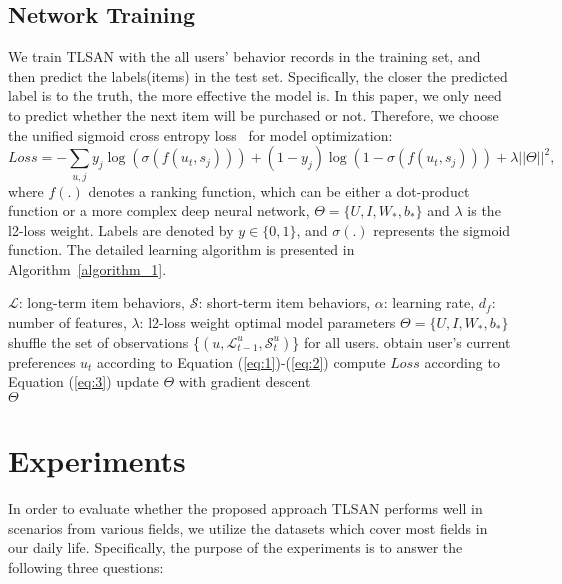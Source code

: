 \documentclass[preprint,12pt]{elsarticle}
\newcommand{\tool}{TLSAN\xspace}
\begin{document}
\begin{sloppypar}
\subsection{Network Training}

We train \tool with the all users' behavior records in the training set, and then predict the labels(items) in the test set. Specifically, the closer the predicted label is to the truth, the more effective the model is. In this paper, we only need to predict whether the next item will be purchased or not. Therefore, we choose the unified sigmoid cross entropy loss~\cite{zhou2018atrank} for model optimization:
\begin{equation}
Loss = -\sum_{u,j} y_j\log(\sigma(f(u_t, s_j))) + (1-y_j)\log(1-\sigma(f(u_t, s_j))) + \lambda ||\Theta||^2,\label{eq:3}
\end{equation}
where $f(.)$ denotes a ranking function, which can be either a dot-product function or a more complex deep neural network, $\Theta=\{U,I,W_*,b_*\}$ and $\lambda$ is the l2-loss weight. Labels are denoted by $y\in \{0, 1\}$, and $\sigma(.)$ represents the sigmoid function. The detailed learning algorithm is presented in Algorithm~\ref{algorithm_1}.

\begin{algorithm}[ht]
	\caption{Learning Algorithm of \tool}
	\begin{algorithmic}[1]
		\Require 
		$\mathcal{L}$: long-term item behaviors,
		$\mathcal{S}$: short-term item behaviors,
		$\alpha$: learning rate,
		$d_f$: number of features,
		$\lambda$: l2-loss weight
		\Ensure 
		optimal model parameters $\Theta=\{U,I,W_*,b_*\}$ 
		\Repeat 
		\State shuffle the set of observations \{$(u,\mathcal{L}_{t-1}^u,\mathcal{S}_t^u)$\} for all users. 
		\State obtain user's current preferences $u_t$ according to Equation (\ref{eq:1})-(\ref{eq:2})
		\State compute $Loss$ according to Equation (\ref{eq:3})
		\State update $\Theta$ with gradient descent
		\EndFor
		 \\
		\Return $\Theta$
	\end{algorithmic}
	\label{algorithm_1}
\end{algorithm}

\section{Experiments}
\label{sec_experiments}

In order to evaluate whether the proposed approach \tool performs well in scenarios from various fields, we utilize the datasets which cover most fields in our daily life. Specifically, the purpose of the experiments is to answer the following three questions:


\end{sloppypar}
\end{document}
